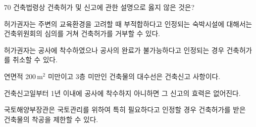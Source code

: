 \begin{question}{70}
건축법령상 건축허가 및 신고에 관한 설명으로 옳지 않은 것은?
\begin{choices}
  \item 허가권자는 주변의 교육환경을 고려할 때 부적합하다고 인정되는 숙박시설에 대해서는 건축위원회의 심의를 거쳐 건축허가를 거부할 수 있다.
  \item 허가권자는 공사에 착수하였으나 공사의 완료가 불가능하다고 인정되는 경우 건축허가를 취소할 수 있다.
  \item 연면적 200\,m$^2$ 미만이고 3층 미만인 건축물의 대수선은 건축신고 사항이다.
  \item 건축신고일부터 1년 이내에 공사에 착수하지 아니하면 그 신고의 효력은 없어진다.
  \item 국토해양부장관은 국토관리를 위하여 특히 필요하다고 인정할 경우 건축허가를 받은 건축물의 착공을 제한할 수 있다.
\end{choices}
\end{question}
